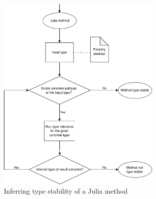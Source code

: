 \begin{figure}
  \includegraphics[width=8cm]{figs/infer-ts.pdf}
  \caption{Inferring type stability of a Julia method}%
  \label{fig:infer-ts}
\end{figure}
